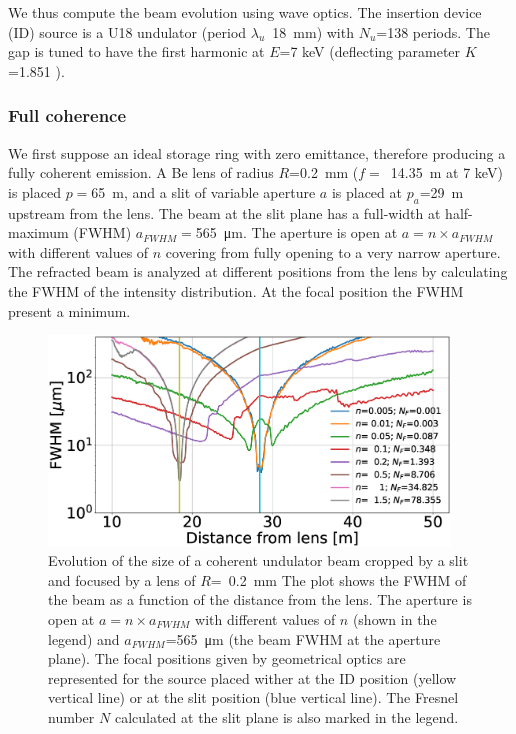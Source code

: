 \documentclass{iucr}              %
\begin{document}


We thus compute the beam evolution using wave optics. The insertion device (ID) source is a U18 undulator (period $\lambda_u$~\SI{18}{\milli\meter}) with $N_u$=138 periods. The gap is tuned to have the first harmonic at $E$=7 keV (deflecting parameter $K$=1.851 ). 

\subsubsection{Full coherence} We first suppose an ideal storage ring with zero emittance, therefore producing a fully coherent emission. A Be lens of radius $R$=\SI{0.2}{\milli\meter} ($f=$~\SI{14.35}{\meter} at 7 keV) is placed $p=$\SI{65}{\meter}, and a slit of variable aperture $a$ is placed at $p_a$=\SI{29}{\meter} upstream from the lens. The beam at the slit plane has a full-width at half-maximum (FWHM) $a_{FWHM}=$\SI{565}{\micro\meter}. The aperture is open at $a = n \times a_{FWHM}$ with different values of $n$ covering from fully opening to a very narrow aperture. The refracted beam is analyzed at different positions from the lens by calculating the FWHM of the intensity distribution. At the focal position the FWHM present a minimum. 

\begin{figure}\label{fig:oneTFund}
    \centering
    \includegraphics[width=0.95\textwidth]{figures/oneTF_UndSource_RectSlit_R200um.eps}

    \caption{Evolution of the size of a coherent undulator beam cropped by a slit and focused by a lens of $R$=~\SI{0.2}{\milli\meter} 
    The plot shows the FWHM of the beam  as a function of the distance from the lens. The aperture is open at $a = n \times a_{FWHM}$ with different values of $n$ (shown in the legend) and $a_{FWHM}$=\SI{565}{\micro\meter} (the beam FWHM at the aperture plane). The focal positions given by geometrical optics are represented for the source placed wither at the ID position (yellow vertical line) or at the slit position (blue vertical line).
    The Fresnel number $N$ calculated at the slit plane is also marked in the legend.
    }
\end{figure}
\end{document}

